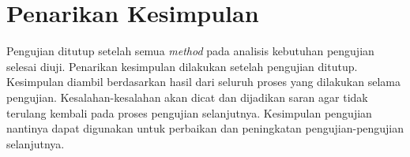\section{Penarikan Kesimpulan}

Pengujian ditutup setelah semua \emph{method} pada analisis kebutuhan
pengujian selesai diuji. Penarikan kesimpulan dilakukan setelah
pengujian ditutup. Kesimpulan diambil berdasarkan hasil dari seluruh
proses yang dilakukan selama pengujian. Kesalahan-kesalahan akan dicat
dan dijadikan saran agar tidak terulang kembali pada proses pengujian
selanjutnya. Kesimpulan pengujian nantinya dapat digunakan untuk
perbaikan dan peningkatan pengujian-pengujian selanjutnya.

